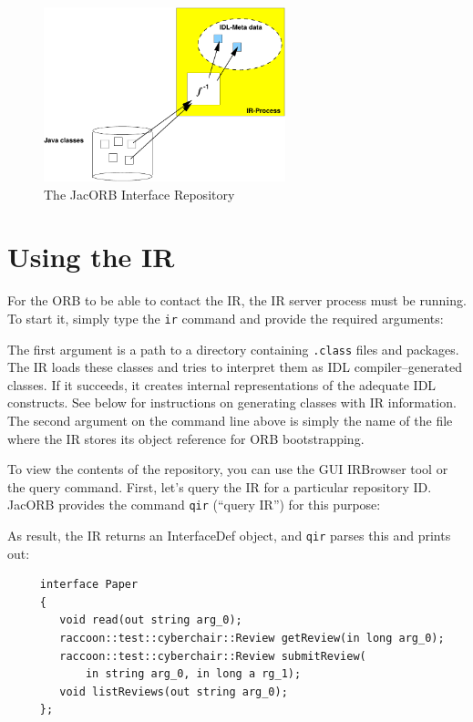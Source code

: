 \begin{figure}[htb]
  \begin{center}
    \includegraphics[width=7cm]{IFR/IR-Process}
\end{center}
\caption{The JacORB Interface Repository}
\label{IR-Process}
\end{figure}

\section{Using the IR}

For the ORB to be able to contact the IR, the IR server process must
be running. To start it, simply type the {\tt ir} command and provide
the required arguments:


The first  argument is  a path to  a directory containing  {\tt .class}
files and packages. The IR  loads these classes and tries to interpret
them as  IDL compiler--generated classes.  If it  succeeds, it creates
internal representations  of the  adequate IDL constructs. See below for
instructions on generating classes with IR information. The second
argument on  the command  line above  is simply the  name of  the file
where the IR stores its object reference for ORB bootstrapping.

To view the contents of the repository, you can use the GUI IRBrowser
tool or the query command. First, let's query the IR for a particular
repository ID. JacORB provides the command {\tt qir} (``query IR'')
for this purpose:


As result, the IR returns an InterfaceDef object, and {\tt qir} parses
this and prints out:

\begin{verbatim}
     interface Paper
     {
        void read(out string arg_0);
        raccoon::test::cyberchair::Review getReview(in long arg_0);
        raccoon::test::cyberchair::Review submitReview(
            in string arg_0, in long a rg_1);
        void listReviews(out string arg_0);
     };
\end{verbatim}


